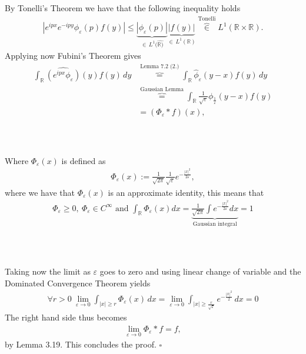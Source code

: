 \documentclass{beamer}
\numberwithin{equation}{section}
\begin{document}
\begin{frame}\frametitle{{\normalsize \secname} \\ {\large \subsecname}}
    By Tonelli's Theorem we have that the following inequality holds
    \begin{align}
        | e^{ipx}e^{-ipy} \phi_\varepsilon(p) f(y) | \leq \underbrace{|\phi_\varepsilon(p) |}_{\in \, L^1(\hat{\mathbb{R})}} \underbrace{| f(y) |}_{\in \, L^1(\mathbb{R})} \overbrace{\in}^{\text{Tonelli}} L^1( \mathbb{R} \times \mathbb{R}).
    \end{align}
    Applying now Fubini's Theorem gives
    \begin{align}
        \int_\mathbb{R} \widehat{\left( e^{ipx} \phi_\varepsilon  \right)}(y) f(y) \, dy &\overbrace{=}^{\text{Lemma 7.2 (2.)}} \int_\mathbb{R} \hat{\phi}_\varepsilon(y-x) f(y) \, dy \\
        &\overbrace{=}^{\text{Gaussian Lemma}} \int_\mathbb{R} \frac{1}{\sqrt{\varepsilon}} \phi_{\frac{1}{\varepsilon}}(y - x) f(y) \\ 
        &= (\Phi_\varepsilon * f)(x),
    \end{align}
\end{frame}

\begin{frame}\frametitle{{\normalsize \secname} \\ {\large \subsecname}}
    Where $\Phi_\varepsilon(x)$ is defined as
    \begin{align}
        \Phi_\varepsilon(x) := \frac{1}{\sqrt{2\pi}}\frac{1}{\sqrt{\varepsilon}}e^{-\frac{|x|^2}{2\varepsilon}},
    \end{align}
    where we have that $\Phi_\varepsilon(x)$ is an approximate identity, this means that
    \begin{align}
        \Phi_\varepsilon \geq 0, \ \Phi_\varepsilon \in C^\infty \text{ and }
        \int_\mathbb{R} \Phi_\varepsilon(x) dx = \underbrace{\frac{1}{\sqrt{2 \pi}} \int e^{-\frac{|x|^2}{2 \varepsilon}} dx}_{\text{Gaussian integral}} = 1
    \end{align}
\end{frame}

\begin{frame}\frametitle{{\normalsize \secname} \\ {\large \subsecname}}
    Taking now the limit as $\varepsilon$ goes to zero and using linear change of variable and the Dominated Convergence Theorem yields
    \begin{align}
        \forall r>0 \ \lim_{\varepsilon \rightarrow 0} \int_{|x| \geq r} \Phi_\varepsilon(x) \, dx = \lim_{\varepsilon \rightarrow 0} \int_{|x| \geq \frac{r}{\sqrt{\varepsilon}}} e^{-\frac{|x|^2}{2}} \, dx = 0
    \end{align}
    The right hand side thus becomes
    \begin{align}
        \lim_{\varepsilon \rightarrow 0} \Phi_\varepsilon * f = f,
    \end{align}
    by Lemma 3.19.
    This concludes the proof. \hfill $\square$
\end{frame}
\end{document}
